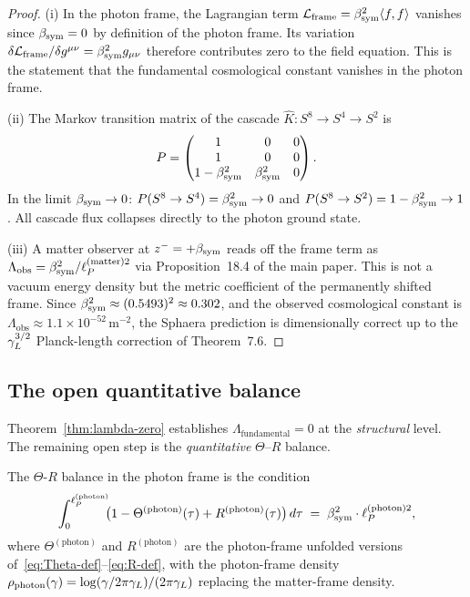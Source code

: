 \begin{proof}
(i) In the photon frame, the Lagrangian term
$\mathcal{L}_{\mathrm{frame}} = \beta_{\mathrm{sym}}^2\langle f,f\rangle$ vanishes
since $\beta_{\mathrm{sym}} = 0$ by definition of the photon frame. Its variation
$\delta\mathcal{L}_{\mathrm{frame}}/\delta g^{\mu\nu} = \beta_{\mathrm{sym}}^2
g_{\mu\nu}$ therefore contributes zero to the field equation.
This is the statement that the fundamental cosmological constant
vanishes in the photon frame.

(ii) The Markov transition matrix of the cascade
$\hat{K}: S^8 \to S^4 \to S^2$ is
\[
  P = \begin{pmatrix}1&0&0\\1&0&0\\1-\beta_{\mathrm{sym}}^2&\beta_{\mathrm{sym}}^2&0\end{pmatrix}.
\]
In the limit $\beta_{\mathrm{sym}}\to 0$: $P(S^8\to S^4) = \beta_{\mathrm{sym}}^2 \to 0$ and
$P(S^8\to S^2) = 1-\beta_{\mathrm{sym}}^2 \to 1$.
All cascade flux collapses directly to the photon ground state.

(iii) A matter observer at $z^- = +\beta_{\mathrm{sym}}$ reads off the frame term
as $\Lambda_{\mathrm{obs}} = \beta_{\mathrm{sym}}^2/\ell_P^{(\mathrm{matter})2}$ via
Proposition~18.4 of the main paper. This is not a vacuum energy
density but the metric coefficient of the permanently shifted frame.
Since $\beta_{\mathrm{sym}}^2 \approx (0.5493)^2 \approx 0.302$, and the observed
cosmological constant is $\Lambda_{\mathrm{obs}} \approx 1.1\times
10^{-52}\,\mathrm{m}^{-2}$, the Sphaera prediction is dimensionally
correct up to the $\gamma_L^{3/2}$ Planck-length correction of Theorem~7.6.
\end{proof}

\subsection{The open quantitative balance}
\label{ssec:open-balance}

Theorem~\ref{thm:lambda-zero} establishes $\Lambda_{\mathrm{fundamental}}=0$
at the \emph{structural} level. The remaining open step is the
\emph{quantitative} $\Theta$--$R$ balance.

\begin{definition}
\label{def:tr-balance}
The $\Theta$-$R$ balance in the photon frame is the condition
\begin{equation}\label{eq:tr-balance}
  \int_0^{\ell_P^{(\mathrm{photon})}} \!\!
  \bigl(1 - \Theta^{(\mathrm{photon})}(\tau) + R^{(\mathrm{photon})}(\tau)\bigr)
  \,d\tau \;=\; \beta_{\mathrm{sym}}^2 \cdot \ell_P^{(\mathrm{photon})2},
\end{equation}
where $\Theta^{(\mathrm{photon})}$ and $R^{(\mathrm{photon})}$ are the
photon-frame unfolded versions of~\eqref{eq:Theta-def}--\eqref{eq:R-def},
with the photon-frame density $\rho_{\mathrm{photon}}(\gamma) =
\log(\gamma/2\pi\gamma_L)/(2\pi\gamma_L)$ replacing the matter-frame density.
\end{definition}

